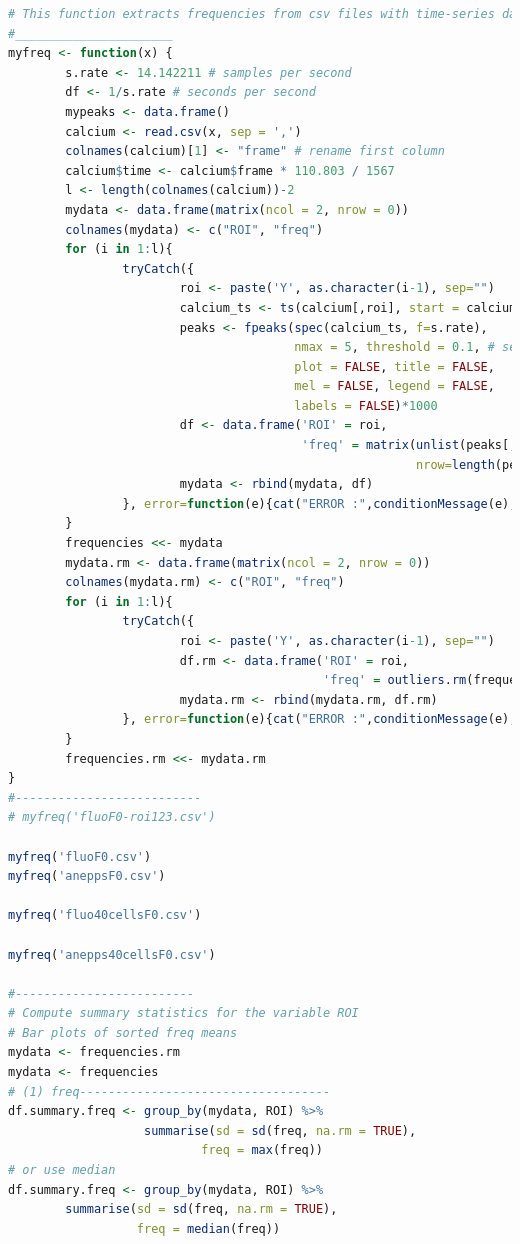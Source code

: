 \documentclass{biophys-new}
\begin{document}
\begin{lstlisting}[language=R]
# This function extracts frequencies from csv files with time-series data
#______________________
myfreq <- function(x) {
        s.rate <- 14.142211 # samples per second
        df <- 1/s.rate # seconds per second
        mypeaks <- data.frame()
        calcium <- read.csv(x, sep = ',')
        colnames(calcium)[1] <- "frame" # rename first column
        calcium$time <- calcium$frame * 110.803 / 1567
        l <- length(colnames(calcium))-2
        mydata <- data.frame(matrix(ncol = 2, nrow = 0))
        colnames(mydata) <- c("ROI", "freq")
        for (i in 1:l){
                tryCatch({
                        roi <- paste('Y', as.character(i-1), sep="")
                        calcium_ts <- ts(calcium[,roi], start = calcium$time[1])
                        peaks <- fpeaks(spec(calcium_ts, f=s.rate),
                                        nmax = 5, threshold = 0.1, # set nmax for peaks quantity
                                        plot = FALSE, title = FALSE,
                                        mel = FALSE, legend = FALSE,
                                        labels = FALSE)*1000
                        df <- data.frame('ROI' = roi,
                                         'freq' = matrix(unlist(peaks[,"freq"]),
                                                         nrow=length(peaks[,"freq"]), byrow=T))
                        mydata <- rbind(mydata, df)
                }, error=function(e){cat("ERROR :",conditionMessage(e), "\n")})
        }
        frequencies <<- mydata
        mydata.rm <- data.frame(matrix(ncol = 2, nrow = 0))
        colnames(mydata.rm) <- c("ROI", "freq")
        for (i in 1:l){
                tryCatch({
                        roi <- paste('Y', as.character(i-1), sep="")
                        df.rm <- data.frame('ROI' = roi,
                                            'freq' = outliers.rm(frequencies[frequencies$ROI==roi,]$freq))
                        mydata.rm <- rbind(mydata.rm, df.rm)
                }, error=function(e){cat("ERROR :",conditionMessage(e), "\n")})
        }
        frequencies.rm <<- mydata.rm
}
#--------------------------
# myfreq('fluoF0-roi123.csv')

myfreq('fluoF0.csv')
myfreq('aneppsF0.csv')

myfreq('fluo40cellsF0.csv')

myfreq('anepps40cellsF0.csv')

#-------------------------
# Compute summary statistics for the variable ROI
# Bar plots of sorted freq means
mydata <- frequencies.rm
mydata <- frequencies
# (1) freq-----------------------------------
df.summary.freq <- group_by(mydata, ROI) %>%
                   summarise(sd = sd(freq, na.rm = TRUE),
                           freq = max(freq))
# or use median
df.summary.freq <- group_by(mydata, ROI) %>%
        summarise(sd = sd(freq, na.rm = TRUE),
                  freq = median(freq))


\end{lstlisting}
\end{document}
